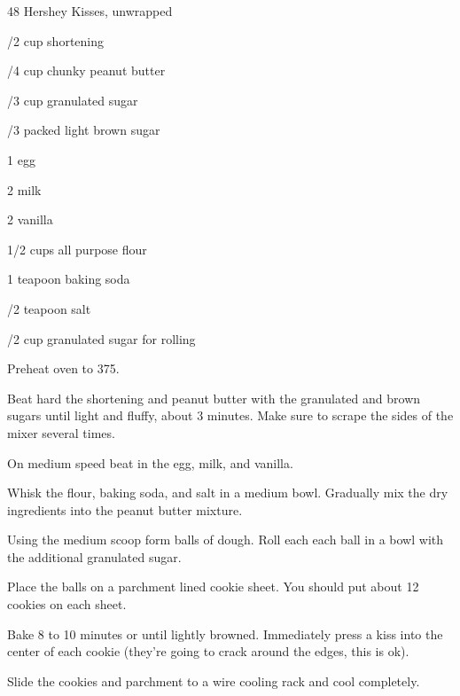 %
%
%
%
\newpage



\begin{IngredientsAndSteps}
    \ListIngredientsAndSteps
    {
        48 Hershey Kisses, unwrapped

        \IngredientsSeparatorClear

        /2 cup shortening

        /4 cup chunky peanut butter

        /3 cup granulated sugar

        /3 packed light brown sugar

        \IngredientsSeparatorClear

        1 egg

        2 \Tbl[s] milk

        2 \tsp[s] vanilla

        \IngredientsSeparatorClear

        1/2 cups all purpose flour

        1 teapoon baking soda

        /2 teapoon salt

        /2 cup granulated sugar for rolling
    }
    {
        Preheat oven to 375\Degrees[F].

        Beat hard the shortening and peanut butter with the granulated and brown sugars
        until light and fluffy, about 3 minutes. Make sure to scrape the sides of the
        mixer several times.

        On medium speed beat in the egg, milk, and vanilla.

        Whisk the flour, baking soda, and salt in a medium bowl. Gradually mix the dry ingredients
        into the peanut butter mixture.

        Using the medium scoop form balls of dough. Roll each each ball in a bowl with the
        additional granulated sugar.

        Place the balls on a parchment lined cookie sheet. You should put about 12 cookies
        on each sheet.

        Bake 8 to 10 minutes or until lightly browned. Immediately press a kiss into the center
        of each cookie (they're going to crack around the edges, this is ok).

        Slide the cookies and parchment to a wire cooling rack and cool completely.
    }
\end{IngredientsAndSteps}

